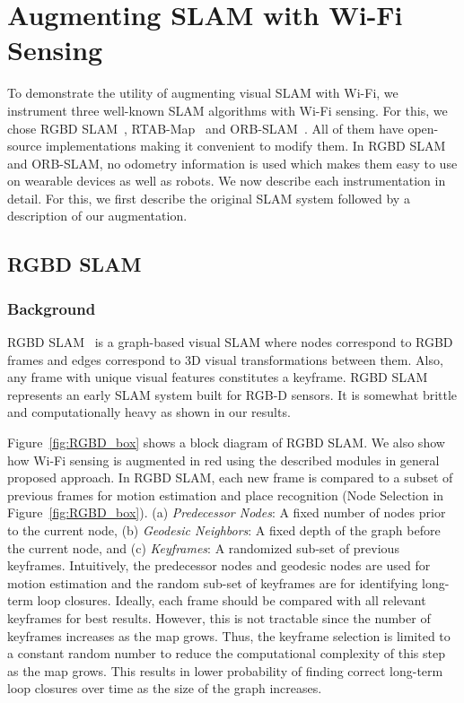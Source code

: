 \section{Augmenting SLAM with Wi-Fi Sensing}
\label{sec:soln}
To demonstrate the utility of augmenting visual SLAM with Wi-Fi, we instrument three well-known SLAM algorithms with Wi-Fi sensing. For this, we chose RGBD SLAM~\cite{burgard:rgbd-slam}, RTAB-Map~\cite{rtabmap} and ORB-SLAM~\cite{orbslam}. All of them have open-source implementations making it convenient to modify them. In RGBD SLAM and ORB-SLAM, no odometry information is used which makes them easy to use on wearable devices as well as robots. We now describe each instrumentation in detail. For this, we first describe the original SLAM system followed by a description of our augmentation. 
\subsection{RGBD SLAM}
\subsubsection{\textbf{Background}}
RGBD SLAM~\cite{burgard:rgbd-slam} is a graph-based visual SLAM where nodes correspond to RGBD frames and edges correspond to 3D visual transformations between them. Also, any frame with unique visual features constitutes a keyframe.
RGBD SLAM represents an early SLAM system built for RGB-D sensors. It is somewhat brittle and computationally heavy as shown in our results.

Figure~\ref{fig:RGBD_box} shows a block diagram of RGBD SLAM. We also show how Wi-Fi sensing is augmented in red using the described modules in general proposed approach. 
In RGBD SLAM, each new frame is compared to a subset of previous frames for motion estimation and place recognition (Node Selection in Figure~\ref{fig:RGBD_box}). 
(a) {\it Predecessor Nodes}: A fixed number of nodes prior to the current node, (b) {\it Geodesic Neighbors}: A fixed depth of the graph before the current node, and (c) {\it Keyframes}: A randomized sub-set of previous keyframes. Intuitively, the predecessor nodes and geodesic nodes are used for motion estimation and the random sub-set of keyframes are for identifying long-term loop closures. Ideally, each frame should be compared with all relevant keyframes for best results. 
However, this is not tractable since the number of keyframes increases as the map grows. 
Thus, the keyframe selection is limited to a constant random number to reduce the computational complexity of this step as the map grows. This results in lower probability of finding correct long-term loop closures over time as the size of the graph increases.

